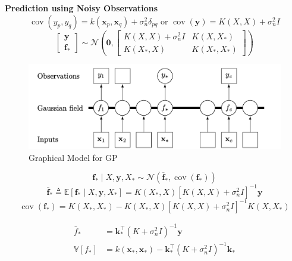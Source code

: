 \documentclass{article}
\begin{document}
\textbf{Prediction using Noisy Observations}
\begin{equation}
    \operatorname{cov}\left(y_{p}, y_{q}\right)=k\left(\mathbf{x}_{p}, \mathbf{x}_{q}\right)+\sigma_{n}^{2} \delta_{p q} \text { or } \operatorname{cov}(\mathbf{y})=K(X, X)+\sigma_{n}^{2} I
\end{equation}
\begin{equation}
    \left[\begin{array}{c}
    \mathbf{y} \\
    \mathbf{f}_{*}
    \end{array}\right] \sim \mathcal{N}\left(\mathbf{0},\left[\begin{array}{cc}
    K(X, X)+\sigma_{n}^{2} I & K\left(X, X_{*}\right) \\
    K\left(X_{*}, X\right) & K\left(X_{*}, X_{*}\right)
    \end{array}\right]\right)
\end{equation}
\begin{figure}[!htp]
    \center
\includegraphics[width=0.5\linewidth]{./images/gp_gm.png}
\caption{Graphical Model for GP}
\end{figure}

\begin{equation}
    \mathbf{f}_{*} \mid X, \mathbf{y}, X_{*} \sim \mathcal{N}\left(\overline{\mathbf{f}}_{*}, \operatorname{cov}\left(\mathbf{f}_{*}\right)\right)
\end{equation}
\begin{equation}
    \overline{\mathbf{f}}_{*} \triangleq \mathbb{E}\left[\mathbf{f}_{*} \mid X, \mathbf{y}, X_{*}\right]=K\left(X_{*}, X\right)\left[K(X, X)+\sigma_{n}^{2} I\right]^{-1} \mathbf{y}
\end{equation}
\begin{equation}
    \operatorname{cov}\left(\mathbf{f}_{*}\right)=K\left(X_{*}, X_{*}\right)-K\left(X_{*}, X\right)\left[K(X, X)+\sigma_{n}^{2} I\right]^{-1} K\left(X, X_{*}\right)
\end{equation}

\begin{equation}
    \begin{aligned}
    \bar{f}_{*} &=\mathbf{k}_{*}^{\top}\left(K+\sigma_{n}^{2} I\right)^{-1} \mathbf{y} \\
    \mathbb{V}\left[f_{*}\right] &=k\left(\mathbf{x}_{*}, \mathbf{x}_{*}\right)-\mathbf{k}_{*}^{\top}\left(K+\sigma_{n}^{2} I\right)^{-1} \mathbf{k}_{*}
    \end{aligned}
\end{equation}
\end{document}
